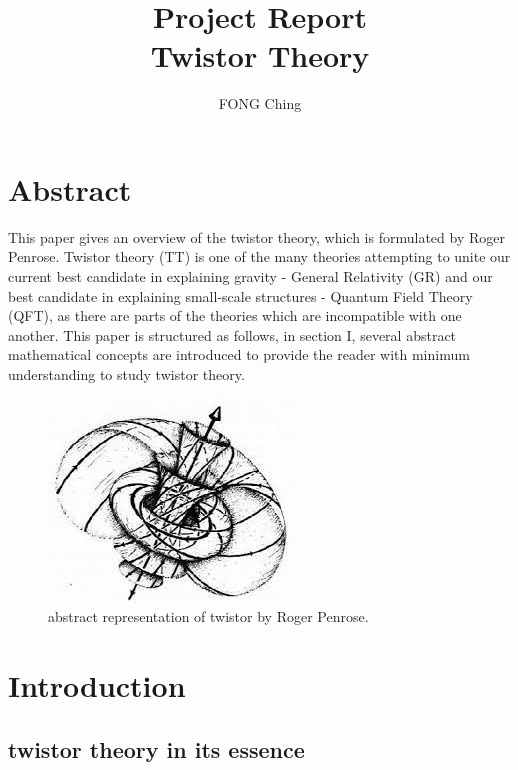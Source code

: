 \documentclass{article}
\title{Project Report \\
        \large Twistor Theory\\}
\author{FONG Ching}
\begin{document}
\maketitle
\tableofcontents

\section{Abstract}

This paper gives an overview of the twistor theory, which is formulated by
Roger Penrose\cite{originalpaper}. Twistor theory (TT) is one of the many
theories attempting to unite our current best candidate in explaining
gravity - General Relativity (GR) and our best candidate in
explaining small-scale structures - Quantum Field Theory (QFT), as there are
parts of the theories which are incompatible with one another. This paper
is structured as follows, in section I, several abstract mathematical
concepts are introduced to provide the reader with minimum understanding to study
twistor theory. 

\newpage

\vspace*{90px}
\begin{figure}[h!]
\begin{center}
  \includegraphics[scale=1.6]{Figures/twistor.jpeg}
\end{center}
\caption{abstract representation of twistor by Roger Penrose.}
\label{fig: twistor pasta}
\end{figure}

\newpage


\section{Introduction}






\subsection{twistor theory in its essence}%
  \label{sub: twistor theory in its essence}
  
\end{document}
